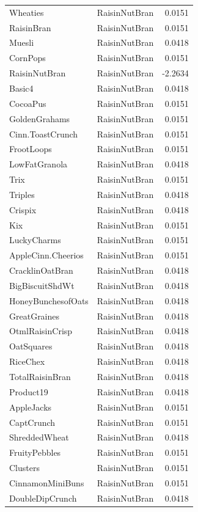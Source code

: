 \begin{longtable}{llr}
Wheaties & RaisinNutBran & 0.0151 \\
RaisinBran & RaisinNutBran & 0.0151 \\
Muesli & RaisinNutBran & 0.0418 \\
CornPops & RaisinNutBran & 0.0151 \\
RaisinNutBran & RaisinNutBran & -2.2634 \\
Basic4 & RaisinNutBran & 0.0418 \\
CocoaPus & RaisinNutBran & 0.0151 \\
GoldenGrahams & RaisinNutBran & 0.0151 \\
Cinn.ToastCrunch & RaisinNutBran & 0.0151 \\
FrootLoops & RaisinNutBran & 0.0151 \\
LowFatGranola & RaisinNutBran & 0.0418 \\
Trix & RaisinNutBran & 0.0151 \\
Triples & RaisinNutBran & 0.0418 \\
Crispix & RaisinNutBran & 0.0418 \\
Kix & RaisinNutBran & 0.0151 \\
LuckyCharms & RaisinNutBran & 0.0151 \\
AppleCinn.Cheerios & RaisinNutBran & 0.0151 \\
CracklinOatBran & RaisinNutBran & 0.0418 \\
BigBiscuitShdWt & RaisinNutBran & 0.0418 \\
HoneyBunchesofOats & RaisinNutBran & 0.0418 \\
GreatGraines & RaisinNutBran & 0.0418 \\
OtmlRaisinCrisp & RaisinNutBran & 0.0418 \\
OatSquares & RaisinNutBran & 0.0418 \\
RiceChex & RaisinNutBran & 0.0418 \\
TotalRaisinBran & RaisinNutBran & 0.0418 \\
Product19 & RaisinNutBran & 0.0418 \\
AppleJacks & RaisinNutBran & 0.0151 \\
CaptCrunch & RaisinNutBran & 0.0151 \\
ShreddedWheat & RaisinNutBran & 0.0418 \\
FruityPebbles & RaisinNutBran & 0.0151 \\
Clusters & RaisinNutBran & 0.0151 \\
CinnamonMiniBuns & RaisinNutBran & 0.0151 \\
DoubleDipCrunch & RaisinNutBran & 0.0418 \\

\end{longtable}
